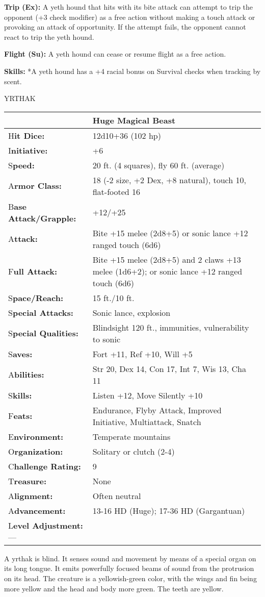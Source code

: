 \documentclass{article}
\begin{document}
\textbf{Trip (Ex): }A yeth hound that hits with its bite attack can attempt to 
trip the opponent (+3 check modifier) as a free action without making a touch attack 
or provoking an attack of opportunity. If the attempt fails, the opponent cannot 
react to trip the yeth hound.

\textbf{Flight (Su):} A yeth hound can cease or resume flight as a free action. 

\textbf{Skills:} *A yeth hound has a +4 racial bonus on Survival checks when tracking 
by scent.

\vspace{12pt}
{\LARGE{}YRTHAK}

\begin{tabular}{|>{\raggedright}p{90pt}|>{\raggedright}p{236pt}|}
\hline
  & Huge Magical Beast\tabularnewline
\hline
H\textbf{it Dice:} & 12d10+36 (102 hp)\tabularnewline
\hline
I\textbf{nitiative:} & +6\tabularnewline
\hline
S\textbf{peed:} & 20 ft. (4 squares), fly 60 ft. (average)\tabularnewline
\hline
A\textbf{rmor Class:} & 18 (-2 size, +2 Dex, +8 natural), touch 10, flat-footed 
16\tabularnewline
\hline
B\textbf{ase Attack/Grapple:} & +12/+25\tabularnewline
\hline
A\textbf{ttack:} & Bite +15 melee (2d8+5) or sonic lance +12 ranged touch (6d6)\tabularnewline
\hline
F\textbf{ull Attack:} & Bite +15 melee (2d8+5) and 2 claws +13 melee (1d6+2); or 
sonic lance +12 ranged touch (6d6)\tabularnewline
\hline
S\textbf{pace/Reach:} & 15 ft./10 ft.\tabularnewline
\hline
S\textbf{pecial Attacks:} & Sonic lance, explosion\tabularnewline
\hline
S\textbf{pecial Qualities:} & Blindsight 120 ft., immunities, vulnerability to 
sonic\tabularnewline
\hline
S\textbf{aves:} & Fort +11, Ref +10, Will +5\tabularnewline
\hline
A\textbf{bilities:} & Str 20, Dex 14, Con 17, Int 7, Wis 13, Cha 11\tabularnewline
\hline
S\textbf{kills:} & Listen +12, Move Silently +10 \tabularnewline
\hline
F\textbf{eats:} & Endurance, Flyby Attack, Improved Initiative, Multiattack, Snatch\tabularnewline
\hline
E\textbf{nvironment:} & Temperate mountains\tabularnewline
\hline
O\textbf{rganization:} & Solitary or clutch (2-4)\tabularnewline
\hline
C\textbf{hallenge Rating:} & 9\tabularnewline
\hline
T\textbf{reasure:} & None\tabularnewline
\hline
A\textbf{lignment:} & Often neutral\tabularnewline
\hline
A\textbf{dvancement:} & 13-16 HD (Huge); 17-36 HD (Gargantuan)\tabularnewline
\hline
L\textbf{evel Adjustment:}--- & \tabularnewline
\hline
\end{tabular}

A yrthak is blind. It senses sound and movement by means of a special organ on 
its long tongue. It emits powerfully focused beams of sound from the protrusion 
on its head. The creature is a yellowish-green color, with the wings and fin being 
more yellow and the head and body more green. The teeth are yellow.
\end{document}
